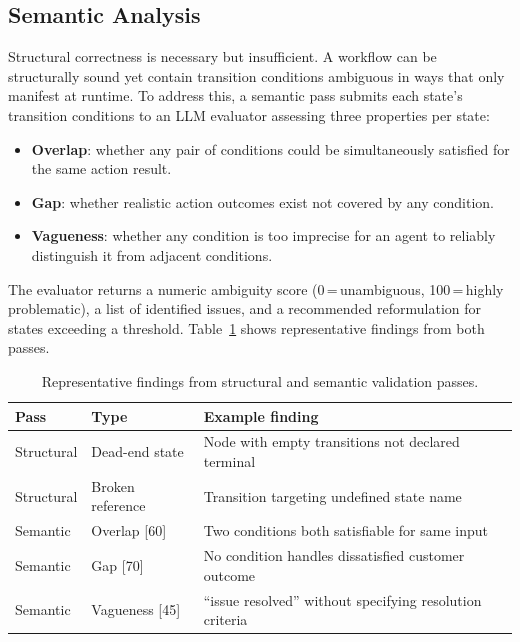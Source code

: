 \documentclass[10pt,conference]{IEEEtran}
\begin{document}
\subsection{Semantic Analysis}

Structural correctness is necessary but insufficient.  A workflow
can be structurally sound yet contain transition conditions
ambiguous in ways that only manifest at runtime.  To address this,
a semantic pass submits each state's transition conditions to an
LLM evaluator assessing three properties per state:

{\sloppy
\begin{itemize}
  \item \textbf{Overlap}: whether any pair of conditions could be
  simultaneously satisfied for the same action result.
  \item \textbf{Gap}: whether realistic action outcomes exist not
  covered by any condition.
  \item \textbf{Vagueness}: whether any condition is too imprecise
  for an agent to reliably distinguish it from adjacent conditions.
\end{itemize}
}

The evaluator returns a numeric ambiguity score
(0\,=\,unambiguous, 100\,=\,highly problematic), a list of
identified issues, and a recommended reformulation for states
exceeding a threshold.  Table~\ref{tab:validation} shows
representative findings from both passes.

\begin{table}[ht]
\centering
\caption{Representative findings from structural and semantic
validation passes.}
\label{tab:validation}
\setlength{\tabcolsep}{3pt}
\renewcommand{\arraystretch}{1.15}
\begin{tabular}{p{1.2cm}p{2.2cm}p{4.0cm}}
\toprule
\textbf{Pass} & \textbf{Type} & \textbf{Example finding} \\
\midrule
Structural & Dead-end state &
  Node with empty transitions not declared terminal \\
Structural & Broken reference &
  Transition targeting undefined state name \\
Semantic & Overlap [60] &
  Two conditions both satisfiable for same input \\
Semantic & Gap [70] &
  No condition handles dissatisfied customer outcome \\
Semantic & Vagueness [45] &
  ``issue resolved'' without specifying resolution criteria \\
\bottomrule
\end{tabular}
\end{table}
\end{document}
